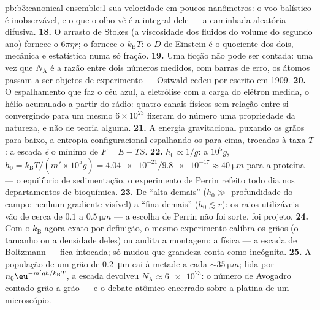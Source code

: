 \begin{solution}{pb:b3:canonical-ensemble:1}
sua velocidade em poucos nanômetros: o voo balístico é inobservável, e
o que o olho vê é a integral dele --- a caminhada aleatória difusiva.
\textbf{18.} O arrasto de Stokes (a viscosidade dos fluidos do volume
do segundo ano) fornece o $6\pi\eta r$; o  fornece o
$k_{\text{B}}T$: o $D$ de Einstein é o quociente dos dois, mecânica e
estatística numa só fração.
\textbf{19.} Uma ficção não pode ser contada: uma vez que
$N_{\text{A}}$ é a razão entre dois números medidos, com barras de
erro, os átomos passam a ser objetos de experimento --- Ostwald cedeu
por escrito em 1909.
\textbf{20.} O espalhamento que faz o céu azul, a eletrólise com a
carga do elétron medida, o hélio acumulado a partir do rádio: quatro
canais físicos sem relação entre si convergindo para um mesmo
$6\times10^{23}$ fizeram do número uma propriedade da natureza, e não
de teoria alguma.
\textbf{21.} A energia gravitacional puxando os grãos para baixo, a
entropia configuracional espalhando-os para cima, trocadas à taxa $T$:
a escada \emph{é} o mínimo de $F = E - TS$.
\textbf{22.} $h_0 \propto 1/g$: a $10^5g$,
$h_0 = k_{\text{B}}T/(m'\times10^5g) = \num{4.04e-21}/
\num{9.8e-17} \approx \qty{40}{\micro m}$ para a proteína --- o
equilíbrio de sedimentação, o experimento de Perrin refeito todo dia
nos departamentos de bioquímica.
\textbf{23.} De ``alta demais'' ($h_0 \gg$ profundidade do campo:
nenhum gradiente visível) a ``fina demais'' ($h_0 \lesssim r$): os
raios utilizáveis vão de cerca de $0.1$ a $\qty{0.5}{\micro m}$ --- a
escolha de Perrin não foi sorte, foi projeto.
\textbf{24.} Com o $k_{\text{B}}$ agora exato por definição, o mesmo
experimento calibra os grãos (o tamanho ou a densidade deles) ou audita
a montagem: a física --- a escada de Boltzmann --- fica intocada; só
mudou que grandeza conta como incógnita.
\textbf{25.} A população de um grão de \qty{0.2}{\micro m} cai à metade
a cada $\sim\qty{35}{\micro m}$; lida por
$n_0\eu^{-m'gh/k_{\text{B}}
T}$, a escada devolveu $N_{\text{A}} \approx \num{6e23}$: o número de
Avogadro contado grão a grão --- e o debate atômico encerrado sobre a
platina de um microscópio.
\end{solution}
